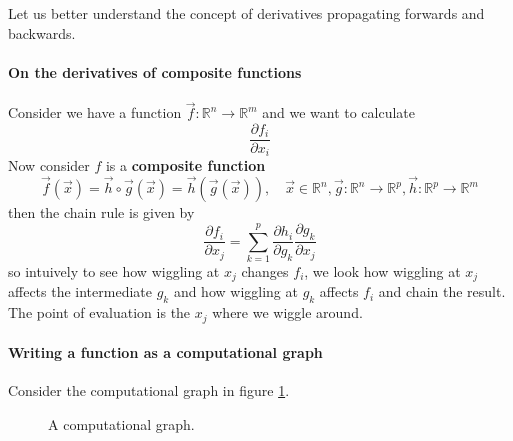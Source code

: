 Let us better understand the concept of derivatives propagating
forwards and backwards.
\paragraph*{On the derivatives of composite functions} Consider we have a function
$\vec{f}: \mathbb{R}^n \rightarrow \mathbb{R}^m$ and we want to calculate
\begin{equation}
    \frac{\partial f_i}{\partial x_i}
\end{equation}
Now consider $f$ is a \textbf{composite function}
\begin{equation}
    \vec{f}(\vec{x}) = \vec{h} \circ \vec{g}(\vec{x}) = \vec{h}(\vec{g}(\vec{x})), \quad \vec{x} \in \mathbb{R}^n, \vec{g}: \mathbb{R}^n \rightarrow \mathbb{R}^p, \vec{h}: \mathbb{R}^p \rightarrow \mathbb{R}^m
\end{equation}
then the chain rule is given by
\begin{equation}
    \frac{\partial f_i}{\partial x_j} = \sum_{k=1}^{p} \frac{\partial h_i}{\partial g_k} \frac{\partial g_k}{\partial x_j}
\end{equation}
so intuively to see how wiggling at $x_j$ changes $f_i$, we look how wiggling at $x_j$ affects the
intermediate $g_k$ and how wiggling at $g_k$ affects $f_i$ and chain the result. The point of
evaluation is the $x_j$ where we wiggle around.

\paragraph*{Writing a function as a computational graph} 
Consider the computational graph in figure \ref{fig:comp_graph}.

\begin{figure}[!htb]
    \centering
    
    \caption{A computational graph.}
    \label{fig:comp_graph}
\end{figure}


